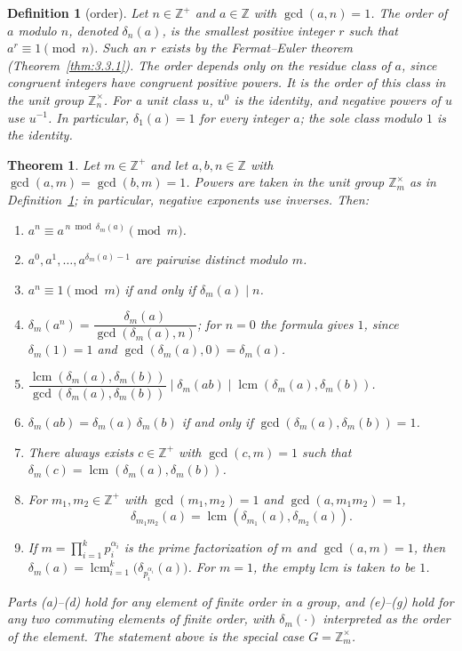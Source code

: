 \documentclass[11pt]{article}
\theoremstyle{ntstyle}
\newtheorem{theorem}{Theorem}[subsection]
\newtheorem{definition}{Definition}[subsection]
\newcommand{\ZmodUnits}[1]{\mathbb{Z}_{#1}^{\times}}
\DeclareMathOperator{\lcm}{lcm}
\begin{document}
\begin{definition}[order]\label{def:6.1.1} Let $n\in\mathbb{Z}^+$ and
	$a\in\mathbb{Z}$ with $\gcd(a,n)=1$. The order of $a$ modulo $n$,
	denoted $\delta_n(a)$, is the smallest positive integer $r$ such that
	$a^r\equiv1\pmod{n}$. Such an $r$ exists by the Fermat--Euler theorem
	(Theorem~\ref{thm:3.3.1}). The order depends only on the residue class of
	$a$, since congruent integers have congruent positive powers.
	It is the order of this class in the unit group $\ZmodUnits{n}$.
	For a unit class $u$, $u^0$ is the identity, and negative powers of $u$ use $u^{-1}$. In particular,
	$\delta_1(a)=1$ for every integer $a$; the sole class modulo $1$ is the identity.
\end{definition}
\begin{theorem}\label{thm:6.1.1} Let $m\in\mathbb{Z}^+$ and let $a,b,n\in\mathbb{Z}$ with
	$\gcd(a,m)=\gcd(b,m)=1$. Powers are taken in the unit group
	$\ZmodUnits{m}$ as in Definition~\ref{def:6.1.1}; in particular,
	negative exponents use inverses. Then:

	\begin{enumerate}[label={\alph*)}]
		\item $a^{n} \equiv a^{\,n \bmod \delta_m(a)} \pmod{m}$.
		\item $a^{0}, a^{1}, \ldots, a^{\delta_m(a) - 1}$ are pairwise
					distinct modulo $m$.
		\item $a^{n} \equiv 1 \pmod{m}$ if and only if $\delta_m(a) \mid n$.
		\item $\delta_m(a^{n}) = \dfrac{\delta_m(a)}{\gcd(\delta_m(a), n)}$; for $n=0$ the formula gives
		$1$, since $\delta_m(1)=1$ and $\gcd(\delta_m(a),0)=\delta_m(a)$.
		\item $\dfrac{\lcm(\delta_m(a), \delta_m(b))}{\gcd(\delta_m(a), \delta_m(b))} \mid \delta_m(ab) \mid
						\lcm(\delta_m(a), \delta_m(b))$.
		\item $\delta_m(ab) = \delta_m(a)\,\delta_m(b)$ if and only if
					$\gcd(\delta_m(a), \delta_m(b)) = 1$.
		\item There always exists $c \in \mathbb{Z}^+$ with $\gcd(c, m) =
						1$ such that $\delta_m(c) = \lcm(\delta_m(a), \delta_m(b))$.
		\item For $m_1, m_2 \in \mathbb{Z}^+$ with $\gcd(m_1, m_2) = 1$
					and $\gcd(a, m_1m_2) = 1$,
					\[
						\delta_{m_1m_2}(a)
						=\lcm(\delta_{m_1}(a),\delta_{m_2}(a)).
					\]
		\item If $m = \prod_{i=1}^{k} p_i^{\alpha_i}$ is the prime factorization
					of $m$ and $\gcd(a,m)=1$, then
					$\delta_m(a)=\lcm_{i=1}^{k}\big(\delta_{p_i^{\alpha_i}}(a)\big)$.
					For $m=1$, the empty lcm is taken to be $1$.
	\end{enumerate}

	Parts (a)--(d) hold for any element of finite order in a group,
	and (e)--(g) hold for any two commuting elements of finite order, with
	$\delta_m(\cdot)$ interpreted as the order of the element. The statement above
	is the special case $G=\ZmodUnits{m}$.
\end{theorem}
\end{document}
